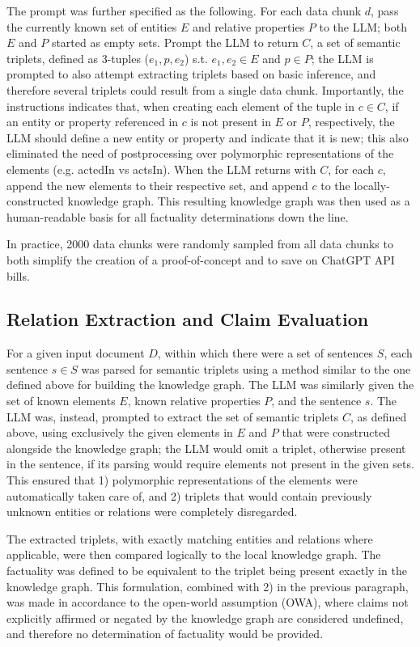 \documentclass[11pt]{article}
\begin{document}
The prompt was further specified as the following. For each data chunk $d$, pass the currently known set of entities $E$ and relative properties $P$ to the LLM; both $E$ and $P$ started as empty sets. Prompt the LLM to return $C$, a set of semantic triplets, defined as 3-tuples ($e_1, p, e_2$) s.t. $e_1, e_2 \in E$ and $p \in P$; the LLM is prompted to also attempt extracting triplets based on basic inference, and therefore several triplets could result from a single data chunk. Importantly, the instructions indicates that, when creating each element of the tuple in $c\in C$, if an entity or property referenced in $c$ is not present in $E$ or $P$, respectively, the LLM should define a new entity or property and indicate that it is new; this also eliminated the need of postprocessing over polymorphic representations of the elements (e.g. actedIn vs actsIn). When the LLM returns with $C$, for each $c$, append the new elements to their respective set, and append $c$ to the locally-constructed knowledge graph. This resulting knowledge graph was then used as a human-readable basis for all factuality determinations down the line. 

In practice, 2000 data chunks were randomly sampled from all data chunks to both simplify the creation of a proof-of-concept and to save on ChatGPT API bills. 

\subsection{Relation Extraction and Claim Evaluation}
For a given input document $D$, within which there were a set of sentences $S$, each sentence $s\in S$ was parsed for semantic triplets using a method similar to the one defined above for building the knowledge graph. The LLM was similarly given the set of known elements $E$, known relative properties $P$, and the sentence $s$. The LLM was, instead, prompted to extract the set of semantic triplets $C$, as defined above, using exclusively the given elements in $E$ and $P$ that were constructed alongside the knowledge graph; the LLM would omit a triplet, otherwise present in the sentence, if its parsing would require elements not present in the given sets. This ensured that 1) polymorphic representations of the elements were automatically taken care of, and 2) triplets that would contain previously unknown entities or relations were completely disregarded. 

The extracted triplets, with exactly matching entities and relations where applicable, were then compared logically to the local knowledge graph. The factuality was defined to be equivalent to the triplet being present exactly in the knowledge graph. This formulation, combined with 2) in the previous paragraph, was made in accordance to the open-world assumption (OWA), where claims not explicitly affirmed or negated by the knowledge graph are considered undefined, and therefore no determination of factuality would be provided.
\end{document}
